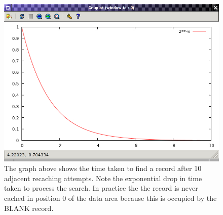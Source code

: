 \documentclass[11pt]{article}
\begin{document}
\newpage
\noindent
\begin{figure}[ht]
\centering
\includegraphics[scale=0.9]{CacheEviction.jpg}
\caption{The graph above shows the time taken to find a record after 10 adjacent recaching attempts. Note the exponential drop in time taken to process the search. In practice the the record is never cached in position 0 of the data area because this is occupied by the BLANK record. }
\end{figure}
\end{document}
